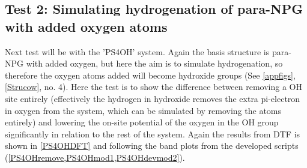 \subsection{Test 2: Simulating hydrogenation of para-NPG with added oxygen atoms}\label{test2}
Next test will be with the 'PS4OH' system. Again the basis structure is para-NPG with added oxygen, but here the aim is to simulate hydrogenation, so therefore the oxygen atoms added will become hydroxide groups (See \cref{appfigs}, \cref{Strucow}, no. 4). Here the test is to show the difference between removing a OH site entirely (effectively the hydrogen in hydroxide removes the extra pi-electron in oxygen from the system, which can be simulated by removing the atoms entirely) and lowering the on-site potential of the oxygen in the OH group significantly in relation to the rest of the system. Again the results from DTF is shown in \cref{PS4OHDFT} and following the band plots from the developed scripts (\cref{PS4OHremove,PS4OHmod1,PS4OHdevmod2}).
